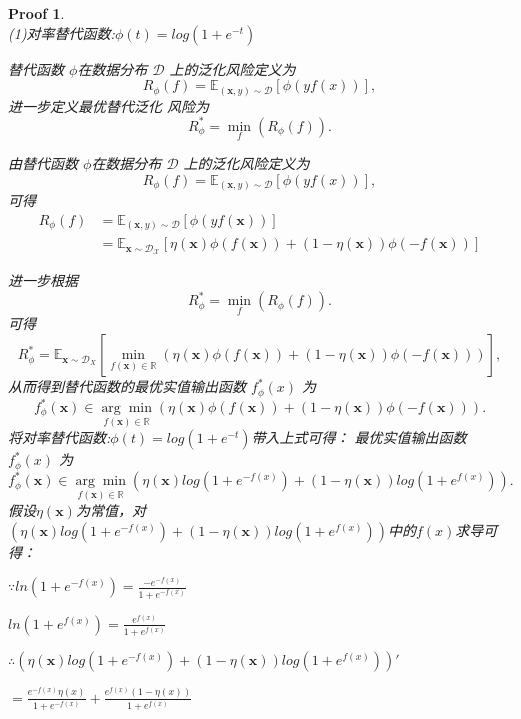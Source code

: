 \documentclass[a4paper,UTF8]{article}
\numberwithin{equation}{section}
\newtheorem*{myProof}{Proof}
\begin{document}
	\begin{myProof}~\\
		
		(1)对率替代函数:$ \phi(t) = log(1+e^{-t})$
		
		替代函数 $\phi$在数据分布 $\mathcal{D}$ 上的泛化风险定义为
		$$
		R_{\phi}(f)=\mathbb{E}_{(\boldsymbol{x}, y) \sim \mathcal{D}}[\phi(y f(x))],
		$$
		进一步定义最优替代泛化 风险为
		$$
		R_{\phi}^{*}=\min _{f}\left(R_{\phi}(f)\right) .
		$$
		
		由替代函数 $\phi$在数据分布 $\mathcal{D}$ 上的泛化风险定义为
		$$
		R_{\phi}(f)=\mathbb{E}_{(\boldsymbol{x}, y) \sim \mathcal{D}}[\phi(y f(x))],
		$$
		可得
		$$
		\begin{aligned}
			R_{\phi}(f) &=\mathbb{E}_{(\boldsymbol{x}, y) \sim \mathcal{D}}[\phi(y f(\boldsymbol{x}))] \\
			&=\mathbb{E}_{\boldsymbol{x} \sim \mathcal{D}_{\mathcal{X}}}[\eta(\boldsymbol{x}) \phi(f(\boldsymbol{x}))+(1-\eta(\boldsymbol{x})) \phi(-f(\boldsymbol{x}))]
		\end{aligned}
		$$
		
		进一步根据$$
		R_{\phi}^{*}=\min _{f}\left(R_{\phi}(f)\right) .
		$$可得
		$$
		R_{\phi}^{*}=\mathbb{E}_{\boldsymbol{x} \sim \mathcal{D}_{X}}\left[\min _{f(\boldsymbol{x}) \in \mathbb{R}}(\eta(\boldsymbol{x}) \phi(f(\boldsymbol{x}))+(1-\eta(\boldsymbol{x})) \phi(-f(\boldsymbol{x})))\right],
		$$
		从而得到替代函数的最优实值输出函数 $f_{\phi}^{*}(x)$ 为
		$$
		f_{\phi}^{*}(\boldsymbol{x}) \in \underset{f(\boldsymbol{x}) \in \mathbb{R}}{\arg \min }(\eta(\boldsymbol{x}) \phi(f(\boldsymbol{x}))+(1-\eta(\boldsymbol{x})) \phi(-f(\boldsymbol{x}))) .
		$$
		将对率替代函数:$ \phi(t) = log(1+e^{-t})$带入上式可得：
		最优实值输出函数 $f_{\phi}^{*}(x)$ 为
		$$
		f_{\phi}^{*}(\boldsymbol{x}) \in \underset{f(\boldsymbol{x}) \in \mathbb{R}}{\arg \min }(\eta(\boldsymbol{x}) log(1+e^{-f(x)})+(1-\eta(\boldsymbol{x})) log(1+e^{f(x)})) .
		$$
		假设$\eta(\boldsymbol{x})$为常值，对$(\eta(\boldsymbol{x}) log(1+e^{-f(x)})+(1-\eta(\boldsymbol{x})) log(1+e^{f(x)}))$中的$f(x)$求导可得：
		
		$\because ln(1+e^{-f(x)}) = \frac{-e^{-f(x)}}{1+e^{-f(x)}} $
		
		$ln(1+e^{f(x)}) = \frac{e^{f(x)}}{1+e^{f(x)}} $
		
		$\therefore (\eta(\boldsymbol{x}) log(1+e^{-f(x)})+(1-\eta(\boldsymbol{x})) log(1+e^{f(x)}))'$
		
		$=\frac{e^{-f(x)}\eta(x)}{1+e^{-f(x)}} +  \frac{e^{f(x)}(1-\eta(x))}{1+e^{f(x)}}$
		

\end{myProof}
\end{document}
